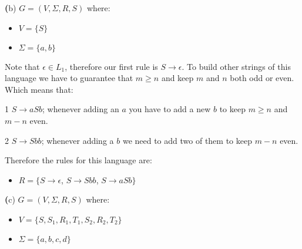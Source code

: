 \documentclass[11pt]{article}
\renewcommand{\part}[1] {{\vspace{0.15in}\noindent\textbf (#1)} \vspace{0.10in}}
\begin{document}
\part{b} $G = (V, \Sigma, R, S)$ where:

\begin{itemize}
    \item{$V = \{S\}$}
    \item{$\Sigma = \{a, b\}$}
\end{itemize}

\par Note that $\epsilon \in L_1$, therefore our first rule is $S \rightarrow \epsilon$. To build other strings of this language we have to guarantee that $m \geq n$ and keep $m$ and $n$ both odd or even. Which means that:

\par 1 $S \rightarrow aSb$; whenever adding an $a$ you have to add a new $b$ to keep $m \geq n$ and $m - n$ even.
\par 2 $S \rightarrow Sbb$; whenever adding a $b$ we need to add two of them to keep $m - n$ even.
\par Therefore the rules for this language are:

\begin{itemize}    
    \item{$R = \{S \rightarrow \epsilon$, $S \rightarrow Sbb$, $S \rightarrow aSb\}$}
\end{itemize}


\part{c} $G = (V, \Sigma, R, S)$ where:

\begin{itemize}
    \item{$V = \{S, S_1, R_1, T_1, S_2, R_2, T_2\}$}
    \item{$\Sigma = \{a, b, c, d\}$}
\end{itemize}
    
\end{document}
